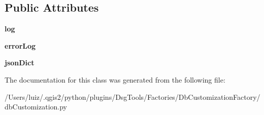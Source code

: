 \subsection*{Public Attributes}
\begin{DoxyCompactItemize}
\item 
\mbox{\label{class_dsg_tools_1_1_factories_1_1_db_customization_factory_1_1db_customization_1_1_db_customization_a39fcc293e2a08d572e43f71762257f3e}} 
{\bfseries log}
\item 
\mbox{\label{class_dsg_tools_1_1_factories_1_1_db_customization_factory_1_1db_customization_1_1_db_customization_a5c878e9b4206aa7fd0816c6eed616937}} 
{\bfseries error\+Log}
\item 
\mbox{\label{class_dsg_tools_1_1_factories_1_1_db_customization_factory_1_1db_customization_1_1_db_customization_ada197ef580ab466558a06e05867a39b9}} 
{\bfseries json\+Dict}
\end{DoxyCompactItemize}


The documentation for this class was generated from the following file\+:\begin{DoxyCompactItemize}
\item 
/\+Users/luiz/.\+qgis2/python/plugins/\+Dsg\+Tools/\+Factories/\+Db\+Customization\+Factory/db\+Customization.\+py\end{DoxyCompactItemize}
